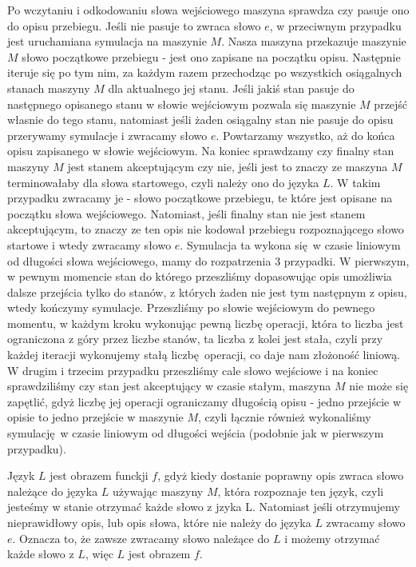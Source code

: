 \documentclass[a4paper]{article}
\begin{document}
\begin{enumerate}
  Po wczytaniu i odkodowaniu słowa wejściowego maszyna sprawdza czy pasuje ono do opisu przebiegu. Jeśli nie pasuje to zwraca słowo $e$, w przeciwnym przypadku jest uruchamiana symulacja na maszynie $M$. Nasza maszyna przekazuje maszynie $M$ słowo początkowe przebiegu - jest ono zapisane na początku opisu.
  Następnie iteruje się po tym nim, za każdym razem przechodząc po wszystkich osiągalnych stanach maszyny $M$ dla aktualnego jej stanu. Jeśli jakiś stan pasuje do następnego opisanego stanu w słowie wejściowym pozwala się maszynie $M$ przejść własnie do tego stanu, natomiast jeśli żaden osiągalny stan nie pasuje do opisu przerywamy symulacje i zwracamy słowo $e$. Powtarzamy wszystko, aż do końca opisu zapisanego w słowie wejściowym. Na koniec sprawdzamy czy finalny stan maszyny $M$ jest stanem akceptującym czy nie, jeśli jest to znaczy ze maszyna $M$ terminowałaby dla słowa startowego, czyli należy ono do języka $L$. W takim przypadku zwracamy je - słowo początkowe przebiegu, te które jest opisane na początku słowa wejściowego. Natomiast, jeśli finalny stan nie jest stanem akceptującym, to znaczy ze ten opis nie kodował przebiegu rozpoznającego słowo startowe i wtedy zwracamy słowo $e$. Symulacja ta wykona się w czasie liniowym od długości słowa wejściowego, mamy do rozpatrzenia 3 przypadki. W pierwszym, w pewnym momencie stan do którego przeszliśmy dopasowując opis umożliwia dalsze przejścia tylko do stanów, z których żaden nie jest tym następnym z opisu, wtedy kończymy symulacje. Przeszliśmy po słowie wejściowym do pewnego momentu, w każdym kroku wykonując pewną liczbę operacji, która to liczba jest ograniczona z góry przez liczbe stanów, ta liczba z kolei jest stała, czyli przy każdej iteracji wykonujemy stałą liczbę operacji, co daje nam złożoność liniową. W drugim i trzecim przypadku przeszliśmy cale słowo wejściowe i na koniec sprawdziliśmy czy stan jest akceptujący w czasie stałym, maszyna $M$ nie może się zapętlić, gdyż liczbę jej operacji ograniczamy długością opisu - jedno przejście w opisie to jedno przejście w maszynie $M$, czyli łącznie również wykonaliśmy symulację w czasie liniowym od długości wejścia (podobnie jak w pierwszym przypadku).

  Język $L$ jest obrazem funckji $f$, gdyż kiedy dostanie poprawny opis zwraca słowo należące do języka $L$ używając maszyny $M$, która rozpoznaje ten język, czyli jesteśmy w stanie otrzymać każde słowo z jzyka L. Natomiast jeśli otrzymujemy nieprawidłowy opis, lub opis słowa, które nie należy do języka $L$ zwracamy słowo $e$. Oznacza to, że zawsze zwracamy słowo należące do $L$ i możemy otrzymać każde słowo z $L$, więc $L$ jest obrazem $f$.


\end{enumerate}
\end{document}
